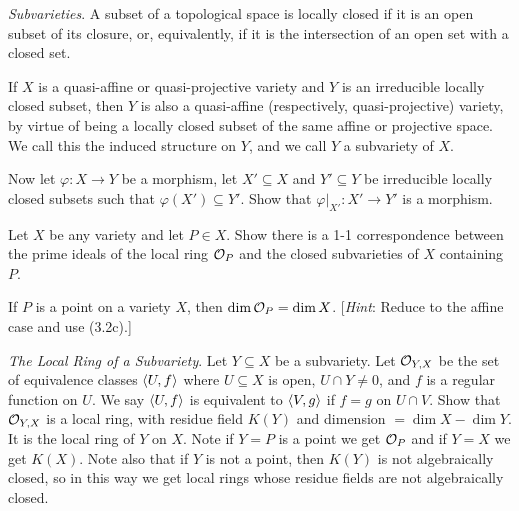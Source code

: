 \documentclass[10pt]{amsart}
\begin{document}
\begin{exercise}[3.10]
    \emph{Subvarieties}. A subset of a topological space is locally closed if it is an 
    open subset of its closure, or, equivalently, if it is the intersection of an open set with 
    a closed set.
    
    If $X$ is a quasi-affine or quasi-projective variety and $Y$ is an irreducible locally closed 
    subset, then $Y$ is also a quasi-affine (respectively, quasi-projective) variety, by virtue 
    of being a locally closed subset of the same affine or projective space. We call this the induced 
    structure on $Y$, and we call $Y$ a subvariety of $X$.
    
    Now let $\varphi:X \to Y$ be a morphism, let $X' \subseteq X$ and $Y' \subseteq Y$ be irreducible locally closed subsets 
    such that $\varphi(X') \subseteq Y'$. Show that $\varphi|_{X'} :X' \to Y'$ 
    is a morphism.
\end{exercise}


\begin{exercise}[3.11]
    Let $X$ be any variety and let $P \in X$. Show there is a 1-1 correspondence between
    the prime ideals of the local ring $\mathcal{O}_P$ and the closed subvarieties of $X$ containing $P$.
\end{exercise}


\begin{exercise}[3.12]
    If $P$ is a point on a variety $X$, then $\dim \mathcal{O}_P = \dim X$. [\emph{Hint}: Reduce to the
    affine case and use (3.2c).]
\end{exercise}


\begin{exercise}[3.13]
    \emph{The Local Ring of a Subvariety}. Let $Y \subseteq X$ be a subvariety. Let $\mathcal{O}_{Y,X}$ be the set 
    of equivalence classes $\left\langle U,f\right\rangle$ where $U \subseteq X$ is open, $U \cap Y \ne 0$, and $f$ is a regular 
    function on $U$. We say $\left\langle U, f\right\rangle$ is equivalent to $\left\langle V, g\right\rangle$ if $f = g$ on $U \cap V$. Show that 
    $\mathcal{O}_{Y,X}$ is a local ring, with residue field $K(Y)$ and dimension $= \dim X - \dim Y$. It is the local ring 
    of $Y$ on $X$. Note if $Y = P$ is a point we get $\mathcal{O}_{P}$ and if $Y = X$ we get $K(X)$. 
    Note also that if $Y$ is not a point, then $K(Y)$ is not algebraically closed, so in this way we 
    get local rings whose residue fields are not algebraically closed.
\end{exercise}
\end{document}
